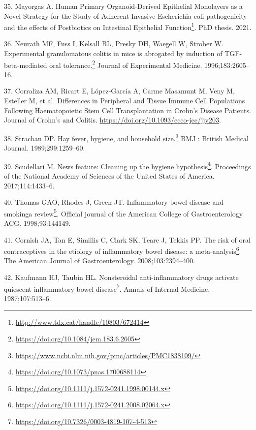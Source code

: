 \documentclass[
  a4paper,
]{book}
\DeclareRobustCommand{\href}[2]{#2\footnote{\url{#1}}}
\newlength{\cslhangindent}
\newlength{\cslentryspacingunit} %
\newenvironment{CSLReferences}[2] %
 {%
  \setlength{\parindent}{0pt}
  \ifodd #1
  \let\oldpar\par
  \def\par{\hangindent=\cslhangindent\oldpar}
  \fi
  \setlength{\parskip}{#2\cslentryspacingunit}
 }%
 {}
\begin{document}
\begin{CSLReferences}{0}{0}
\leavevmode{}%
35. Mayorgas A. \href{http://www.tdx.cat/handle/10803/672414}{Human Primary Organoid-Derived Epithelial Monolayers as a Novel Strategy for the Study of Adherent Invasive Escherichia coli pathogenicity and the effects of Postbiotics on Intestinal Epithelial Function}. PhD thesis. 2021.

\leavevmode{}%
36. Neurath MF, Fuss I, Kelsall BL, Presky DH, Waegell W, Strober W. \href{https://doi.org/10.1084/jem.183.6.2605}{Experimental granulomatous colitis in mice is abrogated by induction of TGF-beta-mediated oral tolerance.} Journal of Experimental Medicine. 1996;183:2605--16.

\leavevmode{}%
37. Corraliza AM, Ricart E, López-García A, Carme Masamunt M, Veny M, Esteller M, et al. Differences in Peripheral and Tissue Immune Cell Populations Following Haematopoietic Stem Cell Transplantation in Crohn{'}s Disease Patients. Journal of Crohn's and Colitis. \url{https://doi.org/10.1093/ecco-jcc/jjy203}.

\leavevmode{}%
38. Strachan DP. \href{https://www.ncbi.nlm.nih.gov/pmc/articles/PMC1838109/}{Hay fever, hygiene, and household size.} BMJ : British Medical Journal. 1989;299:1259--60.

\leavevmode{}%
39. Scudellari M. \href{https://doi.org/10.1073/pnas.1700688114}{News feature: Cleaning up the hygiene hypothesis}. Proceedings of the National Academy of Sciences of the United States of America. 2017;114:1433--6.

\leavevmode{}%
40. Thomas GAO, Rhodes J, Green JT. \href{https://doi.org/10.1111/j.1572-0241.1998.00144.x}{Inflammatory bowel disease and smoking{\textemdash}a review}. Official journal of the American College of Gastroenterology \textbar{} ACG. 1998;93:144149.

\leavevmode{}%
41. Cornish JA, Tan E, Simillis C, Clark SK, Teare J, Tekkis PP. \href{https://doi.org/10.1111/j.1572-0241.2008.02064.x}{The risk of oral contraceptives in the etiology of inflammatory bowel disease: a meta-analysis}. The American Journal of Gastroenterology. 2008;103:2394--400.

\leavevmode{}%
42. Kaufmann HJ, Taubin HL. \href{https://doi.org/10.7326/0003-4819-107-4-513}{Nonsteroidal anti-inflammatory drugs activate quiescent inflammatory bowel disease}. Annals of Internal Medicine. 1987;107:513--6.


\end{CSLReferences}
\end{document}
